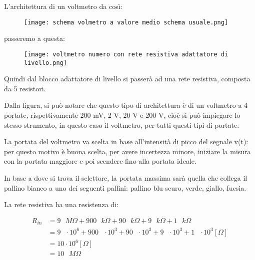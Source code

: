 L'architettura di un voltmetro da così: 

\begin{figure}[h]
    \centering
    \texttt{[image: schema volmetro a valore medio schema usuale.png]}
\end{figure}

passeremo a questa: 

\begin{figure}[h]
    \centering
    \texttt{[image: voltmetro numero con rete resistiva adattatore di livello.png]}
\end{figure}

Quindi dal blocco adattatore di livello si passerà ad una rete resistiva, composta da 5 resistori. \newline 

Dalla figura, si può notare che questo tipo di architettura è di un voltmetro a 4 portate, rispettivamente 200 mV, 2 V, 20 V e 200 V, 
cioè si può impiegare lo stesso strumento, in questo caso il voltmetro, per tutti questi tipi di portate. \newline 

La portata del voltmetro va scelta in base all'intensità di picco del segnale v(t): 
per questo motivo è buona scelta, per avere incertezza minore, iniziare la misura con la portata maggiore e poi scendere fino alla portata ideale. \newline 

In base a dove si trova il selettore, la portata massima sarà quella che collega il pallino bianco a uno dei seguenti pallini: pallino blu scuro, verde, giallo, fucsia. \newline 

La rete resistiva ha una resistenza di: 

{
    \Large 
    \begin{equation}
        \begin{split}
        R_{in}
        &=
        9 \text{ } M \Omega
        + 
        900 \text{ } k \Omega
        + 
        90 \text{ } k \Omega
        + 
        9 \text{ } k \Omega
        + 
        1 \text{ } k \Omega
        \\
        &= 
        9 \text{ } \cdot 10^{6} 
        + 
        900 \text{ } \cdot 10^{3} 
        + 
        90 \text{ } \cdot 10^{3} 
        + 
        9 \text{ } \cdot 10^{3} 
        + 
        1 \text{ } \cdot 10^{3}
        [\Omega]
        \\
        &=
        10 \cdot 10^{6} [\Omega] 
        \\
        &= 
        10 \text{ } M \Omega
        \end{split}
    \end{equation}
}

